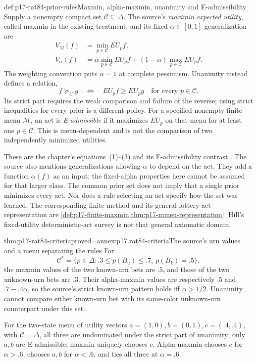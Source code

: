 \begin{hbdefinition}{def:p17-rat84-prior-rules}{Maxmin, alpha-maxmin, unanimity and E-admissibility}
Supply a nonempty compact set \(\mathcal C\subseteq\Delta\). The source's
\emph{maximin expected utility}, called maxmin in the existing treatment,
and its fixed \(\alpha\in[0,1]\) generalization are
\[
\begin{aligned}
 V_M(f)&=\min_{p\in\mathcal C}EU_p f,\\
 V_\alpha(f)&=\alpha\min_{p\in\mathcal C}EU_p f
                   +(1-\alpha)\max_{p\in\mathcal C}EU_p f.
\end{aligned}
\]
The weighting convention puts \(\alpha=1\) at complete pessimism.
Unanimity instead defines a relation,
\[
       f\succeq_U g\quad\Longleftrightarrow\quad
       EU_p f\geq EU_p g\quad\text{for every }p\in\mathcal C.
\]
Its strict part requires the weak comparison and failure of the reverse;
using strict inequalities for every prior is a different policy.
For a specified nonempty finite menu \(\mathcal M\), an act is
\emph{E-admissible} if it maximizes \(EU_p\) on that menu for at
least one \(p\in\mathcal C\). This is menu-dependent and is not
the comparison of two independently minimized utilities.
\end{hbdefinition}

These are the chapter's equations~(1)--(3) and its E-admissibility contrast
\cite[Sec.~2, pp.~496--497]{Hill2021DecisionUncertainty}.
The source also mentions generalizations allowing \(\alpha\) to
depend on the act. They add a function \(\alpha(f)\) as an input;
the fixed-alpha properties here cannot be assumed for that larger class.
The common prior set does not imply that a single prior minimizes every
act. Nor does a rule selecting an act specify how the set was learned.
The corresponding finite method and its general lottery-act representation
are \cref{def:p17-finite-maxmin,thm:p17-mmeu-representation}.
Hill's fixed-utility deterministic-act survey is not that general
axiomatic domain.

\begin{hbtheorem}{thm:p17-rat84-criteria}{proved=annex:p17.rat84-criteria}{The source's urn values and a menu separating the rules}
For
\[
 \mathcal C^*=\{p\in\Delta:.3\leq p(B_u)\leq.7,
                                   \ p(B_k)=.5\},
\]
the maxmin values of the two known-urn bets are \(.5\), and those
of the two unknown-urn bets are \(.3\). Their alpha-maxmin values
are respectively \(.5\) and \(.7-.4\alpha\), so the source's
strict known-urn pattern holds iff \(\alpha>1/2\).
Unanimity cannot compare either known-urn bet with its same-color
unknown-urn counterpart under this set.

For the two-state menu of utility vectors
\(a=(1,0),b=(0,1),c=(.4,.4)\), with \(\mathcal C=\Delta\),
all three are undominated under the strict part of unanimity;
only \(a,b\) are E-admissible; maxmin uniquely chooses \(c\).
Alpha-maxmin chooses \(c\) for \(\alpha>.6\), chooses \(a,b\)
for \(\alpha<.6\), and ties all three at \(\alpha=.6\).
\end{hbtheorem}

